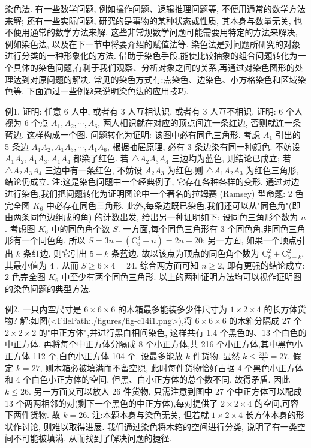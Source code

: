 
染色法.
有一些数学问题, 例如操作问题、逻辑推理问题等, 不便用通常的数学方法来解; 还有一些实际问题, 研究的是事物的某种状态或性质, 其本身与数量无关, 也不便用通常的数学方法来解.
这些非常规数学问题可能需要用特定的方法来解决, 例如染色法, 以及在下一节中将要介绍的赋值法等.
染色法是对问题所研究的对象进行分类的一种形象化的方法.
借助于染色手段,能使比较抽象的组合问题转化为一个具体的染色问题,有利于我们观察、分析对象之间的关系,再通过对染色图形的处理达到对原问题的解决.
常见的染色方式有:点染色、边染色、小方格染色和区域染色等.
下面通过一些例题来说明染色法的应用技巧.



例1. 证明: 任意 6 人中, 或者有 3 人互相认识, 或者有 3 人互不相识.
证明: 6 个人视为 6 个点 $A_1, A_2, \cdots, A_6$, 两人相识就在对应的顶点间连一条红边, 否则就连一条蓝边.
这样构成一个图.
问题转化为证明: 该图中必有同色三角形.
考虑 $A_1$ 引出的 5 条边 $A_1 A_2, A_1 A_3, \cdots, A_1 A_6$, 根据抽屉原理, 必有 3 条边染有同一种颜色.
不妨设 $A_1 A_2, A_1 A_3, A_1 A_4$ 都染了红色.
若 $\triangle A_2 A_3 A_4$ 三边均为蓝色, 则结论已成立; 若 $\triangle A_2 A_3 A_4$ 三边中有一条红色, 不妨设 $A_2 A_3$ 为红色,则 $\triangle A_1 A_2 A_3$ 为红色三角形, 结论仍成立.
注:这是染色问题中一个经典例子, 它存在各种各样的变形.
通过对边进行染色,我们把问题转化为证明图论中一个著名的拉姆赛 (Ramsey) 型命题: 2 色完全图 $K_6$ 中必存在同色三角形.
此外,每条边既已染色,我们还可以从"同色角"(即由两条同色边组成的角) 的计数出发, 给出另一种证明如下:
设同色三角形个数为 $n$. 考虑图 $K_6$ 中的同色角个数 $S$.
一方面,每个同色三角形有 3 个同色角,非同色三角形有一个同色角, 所以 $S=3 n+\left(\mathrm{C}_6^3-n\right)=2 n+20$; 另一方面, 如果一个顶点引出 $k$ 条红边, 则它引出 $5-k$ 条蓝边, 故以该点为顶点的同色角个数为 $\mathrm{C}_k^2+\mathrm{C}_{5-k}^2$, 其最小值为 4 ,
从而 $S \geqslant 6 \times 4=24$. 综合两方面可知 $n \geqslant 2$, 即有更强的结论成立: 2 色完全图 $K_6$ 中至少有两个同色三角形.
以上的两种证明方法均可以视作证明图的染色问题的典型方法.



例2. 一只内空尺寸是 $6 \times 6 \times 6$ 的木箱最多能装多少件尺寸为 $1 \times 2 \times 4$ 的长方体货物?
解:如图(<FilePath:./figures/fig-c14i1.png>),将 $6 \times 6 \times 6$ 的木箱分隔成 27 个 $2 \times 2 \times 2$ 的"中正方体",并进行黑白相间染色, 这样共有 1.4 个黑色的、13 个白色的中正方体.
再将每个中正方体分隔成 8 个小正方体,共 216 个小正方体,其中黑色小正方体 112 个,白色小正方体 104 个.
设最多能放 $k$ 件货物.
显然 $k \leqslant \frac{216}{8}=27$.
假定 $k=27$, 则木箱必被填满而不留空隙, 此时每件货物恰好占据 4 个黑色小正方体和 4 个白色小正方体的空间, 但黑、白小正方体的总个数不同, 故得矛盾.
因此 $k \leqslant 26$.
另一方面又可以放人 26 件货物, 只需注意到图中 27 个中正方体可以配成 13 个两两相邻的对(剩下一个黑色的中正方体),每对提供了 $2 \times 2 \times 4$ 的空间,可容下两件货物.
故 $k=26$.
注:本题本身与染色无关, 但若就 $1 \times 2 \times 4$ 长方体本身的形状作讨论, 则难以取得进展.
我们通过染色将木箱的空间进行分类, 说明了有一类空间不可能被填满, 从而找到了解决问题的捷径.




